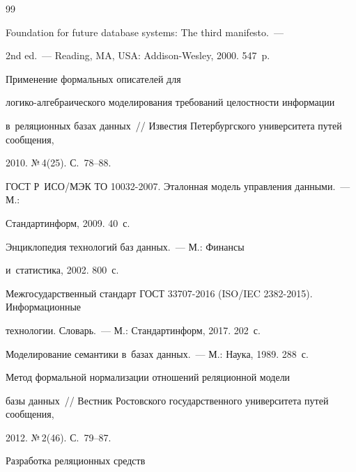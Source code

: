 {\small\frenchspacing

{%


\begin{thebibliography}{99}


 Foundation for future database systems: The third manifesto.~--- 

2nd ed.~--- Reading, MA, USA: Addison-Wesley, 2000. 547~p.


 Применение формальных описателей для  

ло\-ги\-ко-ал\-геб\-ра\-и\-че\-ско\-го моделирования требований це\-лост\-ности информации 

в~реляционных базах данных~/\!\!/ Известия Петербургского университета путей сообщения, 

2010. №\,4(25). С.~78--88.


ГОСТ Р~ИСО\!/\!МЭК ТО 10032-2007. Эталонная модель управ\-ле\-ния данными.~--- М.: 

Стандартинформ, 2009. 40~с.


 Энциклопедия технологий баз данных.~--- М.: Финансы 

и~статистика, 2002. 800~с.


Межгосударственный стандарт ГОСТ 33707-2016 (ISO\!/\!IEC 2382-2015). Информационные 

технологии. Словарь.~--- М.: Стандартинформ, 2017. 202~с.




 Моделирование семантики в~базах данных.~--- М.: Наука, 1989. 288~с.


 Метод формальной нормализации отношений реляционной модели 

базы данных~/\!\!/ Вестник Ростовского государственного университета путей сообщения, 

2012. №\,2(46). С.~79--87.




 Разработка реляционных средств 


\end{thebibliography}}}

